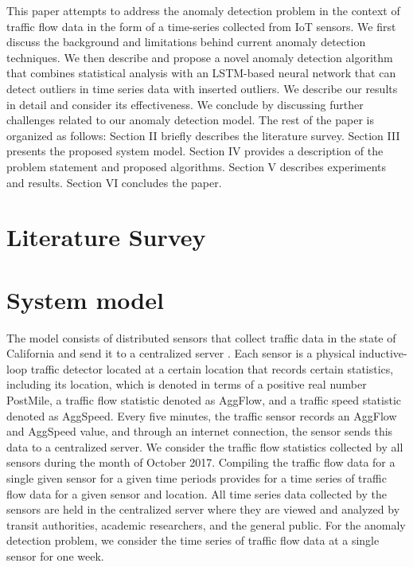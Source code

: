 \documentclass[conference]{IEEEtran}
\begin{document}
This paper attempts to address the anomaly detection problem in the context of traffic flow data in the form of a time-series collected from IoT sensors. We first discuss the background and limitations behind current anomaly detection techniques. We then describe and propose a novel anomaly detection algorithm that combines statistical analysis with an LSTM-based neural network that can detect outliers in time series data with inserted outliers. We describe our results in detail and consider its effectiveness. We conclude by discussing further challenges related to our anomaly detection model. The rest of the paper is organized as follows: Section II briefly describes the literature survey. Section III presents the proposed system model. Section IV provides a description of the problem statement and proposed algorithms. Section V describes experiments and results. Section VI concludes the paper.
      
%
%

\section{Literature Survey}
\label{literature_survey}
    

%
%
\section{System model}
\label{system_model_overview}
The model consists of distributed sensors that collect traffic data in the state of California and send it to a centralized server \cite{PEMSInfo}. Each sensor is a physical inductive-loop traffic detector located at a certain location that records certain statistics, including its location, which is denoted in terms of a positive real number PostMile, a traffic flow statistic denoted as AggFlow, and a traffic speed statistic denoted as AggSpeed. Every five minutes, the traffic sensor records an AggFlow and AggSpeed value, and through an internet connection, the sensor sends this data to a centralized server. We consider the traffic flow statistics collected by all sensors during the month of October 2017. Compiling the traffic flow data for a single given sensor for a given time periods provides for a time series of traffic flow data for a given sensor and location. All time series data collected by the sensors are held in the centralized server where they are viewed and analyzed by transit authorities, academic researchers, and the general public. For the anomaly detection problem, we consider the time series of traffic flow data at a single sensor for one week.
\end{document}
